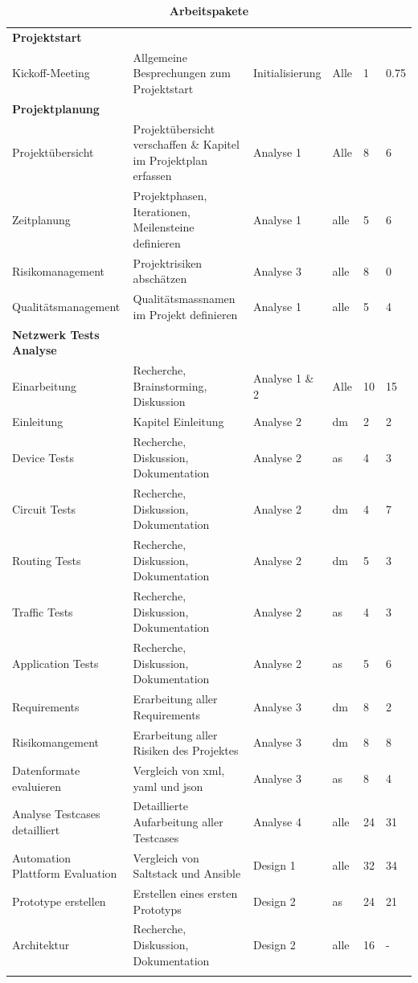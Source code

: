 \documentclass[a4,12pt]{scrartcl}
\begin{document}
\begin{landscape}
\begin{longtable}{ p{5.5cm} p{8cm} l l p{1cm} p{1cm} }
\textbf{Projektstart}&&&&\\ \addlinespace
Kickoff-Meeting & Allgemeine Besprechungen zum Projektstart & Initialisierung & Alle & 1 & 0.75 \\ \addlinespace
\textbf{Projektplanung}&&&&\\ \addlinespace
Projektübersicht & Projektübersicht verschaffen \& Kapitel im Projektplan erfassen & Analyse 1 & Alle & 8 & 6 \\
Zeitplanung & Projektphasen, Iterationen, Meilensteine definieren & Analyse 1 & alle & 5 & 6 \\
Risikomanagement & Projektrisiken abschätzen & Analyse 3 & alle & 8 & 0 \\
Qualitätsmanagement & Qualitätsmassnamen im Projekt definieren & Analyse 1& alle & 5 & 4 \\
\textbf{Netzwerk Tests Analyse}&&&&\\ \addlinespace
Einarbeitung & Recherche, Brainstorming, Diskussion & Analyse 1 \& 2& Alle & 10 & 15 \\ \addlinespace
Einleitung & Kapitel Einleitung & Analyse 2 & dm & 2 & 2 \\ \addlinespace
Device Tests & Recherche, Diskussion, Dokumentation & Analyse 2 & as & 4 & 3 \\ \addlinespace
Circuit Tests & Recherche, Diskussion, Dokumentation & Analyse 2 & dm & 4 & 7 \\ \addlinespace
Routing Tests & Recherche, Diskussion, Dokumentation & Analyse 2 & dm & 5 & 3 \\ \addlinespace
Traffic Tests & Recherche, Diskussion, Dokumentation & Analyse 2 & as & 4 & 3 \\ \addlinespace
Application Tests & Recherche, Diskussion, Dokumentation & Analyse 2 & as & 5 & 6 \\ \addlinespace
Requirements & Erarbeitung aller Requirements & Analyse 3 & dm & 8 & 2 \\ \addlinespace
Risikomangement & Erarbeitung aller Risiken des Projektes & Analyse 3 & dm & 8 & 8 \\ \addlinespace
Datenformate evaluieren & Vergleich von xml, yaml und json & Analyse 3 & as & 8 & 4 \\ \addlinespace
Analyse Testcases detailliert & Detaillierte Aufarbeitung aller Testcases & Analyse 4 & alle & 24 & 31 \\ \addlinespace
Automation Plattform Evaluation & Vergleich von Saltstack und Ansible & Design 1 & alle & 32 & 34 \\ \addlinespace
Prototype erstellen & Erstellen eines ersten Prototyps & Design 2 & as & 24 & 21 \\ \addlinespace
Architektur & Recherche, Diskussion, Dokumentation & Design 2 & alle & 16 & - \\ \addlinespace


 \addlinespace


\hline\caption{\textbf{Arbeitspakete}}
\end{longtable}
\end{landscape}
\end{document}
